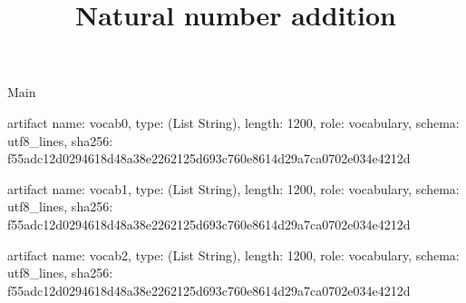 \begin{lexlean}{Main}
\title{Natural number addition}
\begin{semanticmodule}
artifact{
  name: vocab0,
  type: (List String),
  length: 1200,
  role: vocabulary,
  schema: utf8_lines{},
  sha256: f55adc12d0294618d48a38e2262125d693c760e8614d29a7ca0702e034e4212d
}

artifact{
  name: vocab1,
  type: (List String),
  length: 1200,
  role: vocabulary,
  schema: utf8_lines{},
  sha256: f55adc12d0294618d48a38e2262125d693c760e8614d29a7ca0702e034e4212d
}

artifact{
  name: vocab2,
  type: (List String),
  length: 1200,
  role: vocabulary,
  schema: utf8_lines{},
  sha256: f55adc12d0294618d48a38e2262125d693c760e8614d29a7ca0702e034e4212d
}
\end{semanticmodule}
\end{lexlean}
